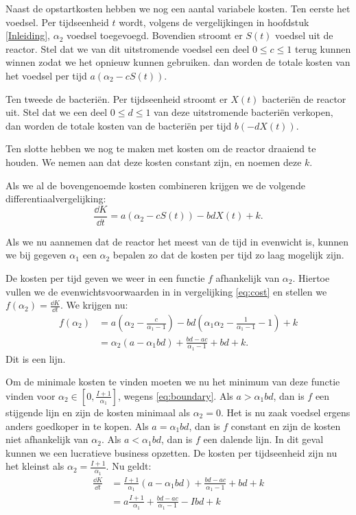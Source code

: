 Naast de opstartkosten hebben we nog een aantal variabele kosten. Ten eerste het voedsel. Per tijdseenheid $t$ wordt, volgens de vergelijkingen in hoofdstuk \ref{Inleiding}, $\alpha_2$ voedsel toegevoegd. Bovendien stroomt er $S(t)$ voedsel uit de reactor. Stel dat we van dit uitstromende voedsel een deel $0\leq c\leq1$ terug kunnen winnen zodat we het opnieuw kunnen gebruiken. dan worden de totale kosten van het voedsel per tijd $a(\alpha_2-cS(t))$. 

Ten tweede de bacteri\"en. Per tijdseenheid stroomt er $X(t)$ bacteri\"en de reactor uit. Stel dat we een deel $0\leq d\leq1$ van deze uitstromende bacteri\"en verkopen, dan worden de totale kosten van de bacteri\"en per tijd $b(-dX(t))$.

Ten slotte hebben we nog te maken met kosten om de reactor draaiend te houden. We nemen aan dat deze kosten constant zijn, en noemen deze $k$.

Als we al de bovengenoemde kosten combineren krijgen we de volgende differentiaalvergelijking:
\begin{equation}
\frac{\dd K}{\dd t} = a(\alpha_2 - cS(t)) - bdX(t) + k. \label{eq:cost}
\end{equation}

Als we nu aannemen dat de reactor het meest van de tijd in evenwicht is, kunnen we bij gegeven $\alpha_1$ een $\alpha_2$ bepalen zo dat de kosten per tijd zo laag mogelijk zijn.

De kosten per tijd geven we weer in een functie $f$ afhankelijk van $\alpha_2$. Hiertoe vullen we de evenwichtsvoorwaarden in in vergelijking \ref{eq:cost} en stellen we $f(\alpha_2) = \frac{\dd K}{\dd t}$. We krijgen nu:
\begin{align*}
f(\alpha_2)
&=a \left( \alpha_2 - \frac{c}{\alpha_1-1} \right) - bd \left( \alpha_1\alpha_2-\frac{1}{\alpha_1-1}-1 \right) + k\\
&=\alpha_2 \left( a-\alpha_1bd \right) + \frac{bd-ac}{\alpha_1-1}+bd+k.
\end{align*}
Dit is een lijn.

Om de minimale kosten te vinden moeten we nu het minimum van deze functie vinden voor $\alpha_2\in[0, \frac{I + 1}{\alpha_1}]$, wegens \ref{eq:boundary}. Als $a > \alpha_1bd$, dan is $f$ een stijgende lijn en zijn de kosten minimaal als $\alpha_2 = 0$. Het is nu zaak voedsel ergens anders goedkoper in te kopen. Als $a = \alpha_1bd$, dan is $f$ constant en zijn de kosten niet afhankelijk van $\alpha_2$. Als $a < \alpha_1bd$, dan is $f$ een dalende lijn. In dit geval kunnen we een lucratieve business opzetten. De kosten per tijdseenheid zijn nu het kleinst als $\alpha_2 = \frac{I+1}{\alpha_1}$. Nu geldt:
\begin{align*}
\frac{\dd K}{\dd t}
&=\frac{I+1}{\alpha_1} \left( a-\alpha_1bd \right) + \frac{bd-ac}{\alpha_1-1}+bd+k\\
&=a\frac{I+1}{\alpha_1} + \frac{bd-ac}{\alpha_1-1} - Ibd + k
\end{align*}

